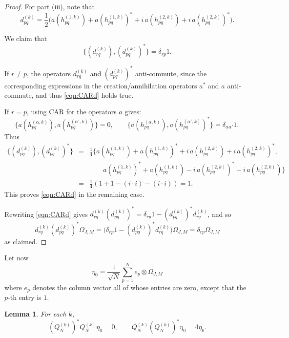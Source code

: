 \documentclass[11pt]{article}
\newtheorem{lemma}{Lemma}
\begin{document}
\begin{proof}
For part (iii), note that 
\[
d_{pq}^{(k)}
=
\frac12\Big(
a(h^{(1,k)}_{pq})
+a(h^{(1,k)}_{pq})^*
+i\,a(h^{(2,k)}_{pq})
+i\,a(h^{(2,k)}_{pq})^*
\Big).
\] 

We claim that 
\begin{equation} \label{eqn:CARd}
\{(d^{(k)}_{rq}), (d^{(k)}_{pq})^*\} = \delta_{rp} 1.
\end{equation}

If $r\neq p$, the operators $d_{rq}^{(k)}$ and $(d_{pq}^{(k)})^*$ anti-commute, since the corresponding expressions in the creation/annihilation operators $a^*$ and $a$ anti-commute, and thus \eqref{eqn:CARd} holds true. 

If $r=p$, using CAR for the operators $a$ gives:
\[\{ a(h_{pq}^{(\alpha,k)}), a(h_{pq}^{(\alpha',k)})\} = 0,\qquad \{ a(h_{pq}^{(\alpha,k)}), a(h_{pq}^{(\alpha',k)})^*\} = \delta_{\alpha\alpha'}1,\]
Thus
\begin{eqnarray*}
    \{(d^{(k)}_{pq}), (d^{(k)}_{pq})^*\} & = & 
    \frac{1}{4}\{a(h^{(1,k)}_{pq}) +a(h^{(1,k)}_{pq})^*
+i\,a(h^{(2,k)}_{pq})
+i\,a(h^{(2,k)}_{pq})^*    
 , \\ && \qquad 
a(h^{(1,k)}_{pq})^*
+a(h^{(1,k)}_{pq})
-i\,a(h^{(2,k)}_{pq})^*
-i\,a(h^{(2,k)}_{pq})
\} \\ &= & \frac{1}{4}(1 + 1 - (i \cdot i) - (i\cdot i)) = 1.
\end{eqnarray*}
This proves \eqref{eqn:CARd} in the remaining case.  

Rewriting \eqref{eqn:CARd} gives $d^{(k)}_{rq}(d^{(k)}_{pq})^* = \delta_{rp}1 - (d^{(k)}_{pq})^* d^{(k)}_{rq}
$, and so 
 \[d^{(k)}_{rq}(d^{(k)}_{pq})^*\Omega_{J,M} = 
\bigl(\delta_{rp}1 - (d^{(k)}_{pq})^* d^{(k)}_{rq}\bigr)\Omega_{J,M} = \delta_{rp} \Omega_{J,M}\] as claimed. 
\end{proof}



Let now 
\[
\eta_0 = \frac{1}{\sqrt{N}} \sum_{p=1}^N e_p \otimes \Omega_{J,M}
\] where $e_p$ denotes the column vector all of whose entries are zero, except that the $p$-th entry is $1$. 

\begin{lemma} \label{lemma:QOnEta} For each $k$,
    \[(Q^{(k)}_N)^* Q^{(k)}_N\eta_0 = 0,  \qquad Q^{(k)}_N (Q^{(k)}_N)^* \eta_0 = 4 \eta_0.\]
\end{lemma}
\end{document}
